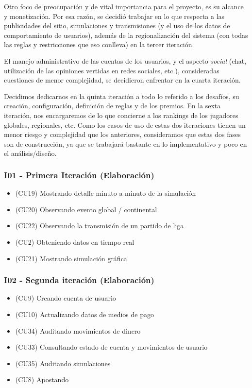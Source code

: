 Otro foco de preocupación y de vital importancia para el proyecto, es su alcance y monetización. Por esa razón, se decidió trabajar en lo que respecta a las publicidades del sitio, simulaciones y transmisiones (y el uso de los datos de comportamiento de usuarios), además de la regionalización del sistema (con todas las reglas y restricciones que eso conlleva) en la tercer iteración.

El manejo administrativo de las cuentas de los usuarios, y el aspecto \emph{social} (chat, utilización de las opiniones vertidas en redes sociales, etc.), consideradas cuestiones de menor complejidad, se decidieron enfrentar en la cuarta iteración.

Decidimos dedicarnos en la quinta iteración a todo lo referido a los desafíos, su creación, configuración, definición de reglas y de los premios. En la sexta iteración, nos encargaremos de lo que concierne a los rankings de los jugadores globales, regionales, etc. Como los casos de uso de estas dos iteraciones tienen un menor riesgo y complejidad que los anteriores, consideramos que estas dos fases son de construcción, ya que se trabajará bastante en lo implementativo y poco en el análisis/diseño.



\subsubsection{I01 - Primera Iteración (Elaboración)}
\begin{itemize}
\item (CU19) Mostrando detalle minuto a minuto de la simulación
\item (CU20) Observando evento global / continental
\item (CU22) Observando la transmisión de un partido de liga
\item (CU2)  Obteniendo datos en tiempo real
\item (CU21) Mostrando simulación gráfica
\end{itemize}

\subsubsection{I02 - Segunda iteración (Elaboración)} 
\begin{itemize}
\item (CU9) Creando cuenta de usuario
\item (CU10) Actualizando datos de medios de pago
\item (CU34) Auditando movimientos de dinero
\item (CU33) Consultando estado de cuenta y movimientos de usuario
\item (CU35) Auditando simulaciones
\item (CU8) Apostando
\end{itemize}


